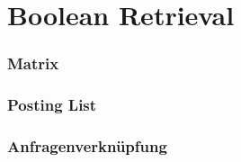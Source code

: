 \chapter{Boolean Retrieval}

\subsection{Matrix}
\subsection{Posting List}
\subsection{Anfragenverkn\"upfung}